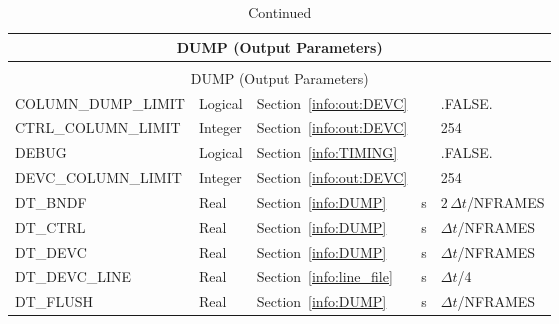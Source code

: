 \documentclass[11pt]{book}
\begin{document}
\begin{longtable}{@{\extracolsep{\fill}}|l|l|l|l|l|}
\caption[Output control parameters ({\ct DUMP} namelist group)]{For more information see Section~\ref{info:DUMP}.}
\label{tbl:DUMP} \\
\hline
\multicolumn{5}{|c|}{{\ct DUMP} (Output Parameters)} \\
\hline \hline
\endfirsthead
\caption[]{Continued} \\
\hline
\multicolumn{5}{|c|}{{\ct DUMP} (Output Parameters)} \\
\hline \hline
\endhead
{\ct COLUMN\_DUMP\_LIMIT}           & Logical      & Section~\ref{info:out:DEVC}            &           & {\ct .FALSE.}                  \\ \hline
{\ct CTRL\_COLUMN\_LIMIT}           & Integer      & Section~\ref{info:out:DEVC}            &           & 254                            \\ \hline
{\ct DEBUG}                         & Logical      & Section~\ref{info:TIMING}              &           & {\ct .FALSE.}                  \\ \hline
{\ct DEVC\_COLUMN\_LIMIT}           & Integer      & Section~\ref{info:out:DEVC}            &           & 254                            \\ \hline
{\ct DT\_BNDF}                      & Real         & Section~\ref{info:DUMP}                &  s        & $2\,\Delta t${\ct /NFRAMES}    \\ \hline
{\ct DT\_CTRL}                      & Real         & Section~\ref{info:DUMP}                &  s        & $\Delta t${\ct /NFRAMES}       \\ \hline
{\ct DT\_DEVC}                      & Real         & Section~\ref{info:DUMP}                &  s        & $\Delta t${\ct /NFRAMES}       \\ \hline
{\ct DT\_DEVC\_LINE}                & Real         & Section~\ref{info:line_file}           &  s        & $\Delta t${\ct /4}             \\ \hline
{\ct DT\_FLUSH}                     & Real         & Section~\ref{info:DUMP}                &  s        & $\Delta t${\ct /NFRAMES}       \\ \hline

\end{longtable}
\end{document}
